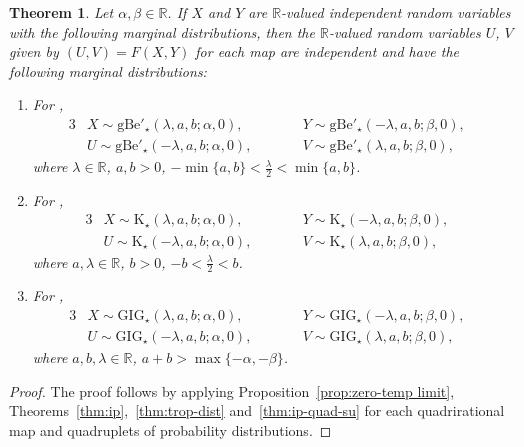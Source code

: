 \documentclass[pdftex]{sigma}
\numberwithin{equation}{section}
\newtheorem{Theorem}{Theorem}[section]
\def\R{\mathbb{R}}
\newcommand{\la}{\lambda}
\def\a{{\alpha}}
\def\b{{\beta}}
\begin{document}
\begin{Theorem}\label{thm:ip-quad}
Let $\a,\b \in \R$. If $X$ and $Y$ are $\R$-valued independent random variables with the following marginal distributions, then the $\R$-valued random variables $U$, $V$ given by $(U,V)=F(X,Y)$ for each map are independent and have the following marginal distributions:
\begin{enumerate}\itemsep=0pt
\item[$(i)$] For \smash{$F= H^{+,\a,\b}_{\mathrm{I},\star}$},
\begin{alignat*}{3}
&X \sim \mathrm{gBe}'_{\star} (\la, a, b; \a, 0), \qquad && Y \sim \mathrm{gBe}'_{\star} (-\la, a, b; \b, 0), &\\
&U \sim \mathrm{gBe}'_{\star} (-\la, a, b; \a, 0), \qquad && V \sim \mathrm{gBe}'_{\star} (\la, a, b; \b, 0),&
\end{alignat*}
where $\lambda \in \R$, $a,b >0$, $- \min\{a,b\} < \frac{\lambda}{2} < \min\{a,b\}$.

\item[$(ii)$] For \smash{$F= H^{+,\a,\b}_{\mathrm{II},\star}$},
\begin{alignat*}{3}
&X \sim \mathrm{K}_{\star} (\la, a, b; \a, 0), \qquad && Y \sim \mathrm{K}_{\star} (-\la, a, b; \b, 0), &\\
&U \sim \mathrm{K}_{\star} (-\la, a, b; \a, 0), \qquad && V \sim \mathrm{K}_{\star} (\la, a, b; \b, 0),&
\end{alignat*}
where $a,\lambda \in \R$, $b >0$, $-b < \frac{\lambda}{2} < b$.

\item[$(iii)$] For \smash{$F= H^{A,\a,\b}_{\mathrm{III},\star}$},
\begin{alignat*}{3}
&X \sim \mathrm{GIG}_{\star} (\la, a, b; \a, 0), \qquad && Y \sim \mathrm{GIG}_{\star} (-\la, a, b; \b, 0),& \\
&U \sim \mathrm{GIG}_{\star}(-\la, a, b; \a, 0), \qquad && V \sim \mathrm{GIG}_{\star} (\la, a, b; \b, 0),&
\end{alignat*}
where $a,b,\lambda \in \R$, $a+b > \max\{-\a,-\b\}$.
\end{enumerate}
\end{Theorem}
\begin{proof}
The proof follows by applying Proposition~\ref{prop:zero-temp limit}, Theorems~\ref{thm:ip},~\ref{thm:trop-dist} and~\ref{thm:ip-quad-su} for each quadrirational map and quadruplets of probability distributions.
\end{proof}
\end{document}
